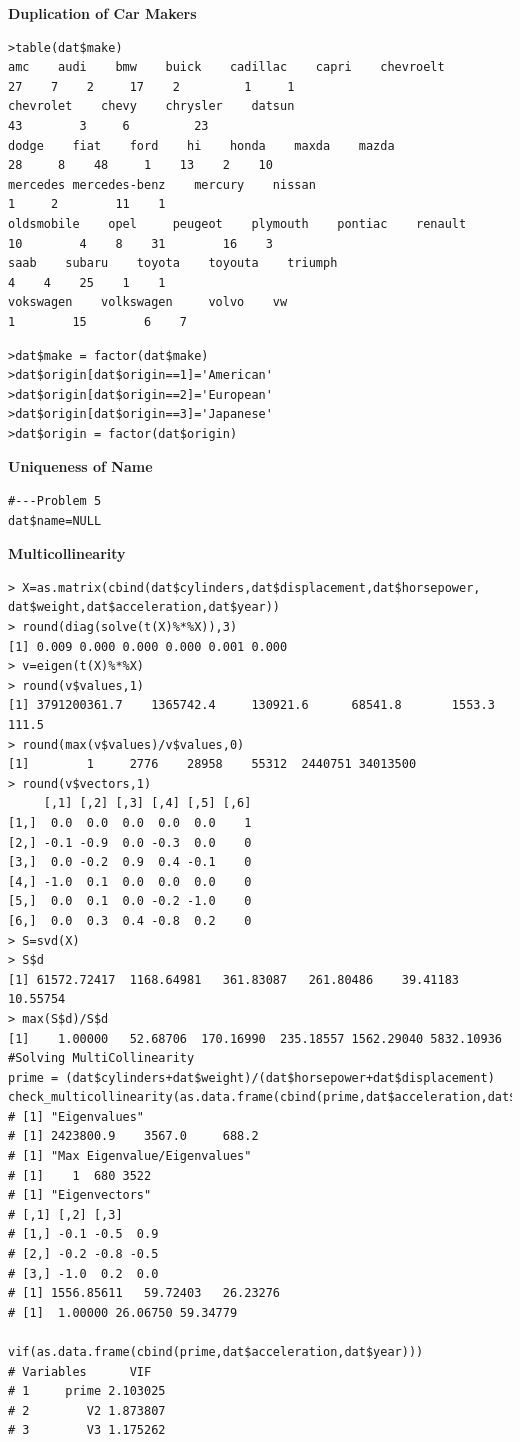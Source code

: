 \documentclass[11pt]{article} %
\begin{document}
\textbf{Duplication of Car Makers}
\begin{lstlisting}
>table(dat$make)
amc    audi    bmw    buick    cadillac    capri    chevroelt
27    7    2     17    2         1     1 
chevrolet    chevy    chrysler    datsun 
43        3     6         23 
dodge    fiat    ford    hi    honda    maxda    mazda
28     8    48     1    13    2    10    
mercedes mercedes-benz    mercury    nissan 
1     2        11    1 
oldsmobile    opel     peugeot    plymouth    pontiac    renault
10        4    8    31        16    3
saab    subaru    toyota    toyouta    triumph
4    4    25    1    1 
vokswagen    volkswagen     volvo    vw 
1        15        6    7 
\end{lstlisting}
\begin{lstlisting}
>dat$make = factor(dat$make)
>dat$origin[dat$origin==1]='American'
>dat$origin[dat$origin==2]='European'
>dat$origin[dat$origin==3]='Japanese'
>dat$origin = factor(dat$origin)
\end{lstlisting}
\textbf{Uniqueness of Name}
\begin{lstlisting}
#---Problem 5
dat$name=NULL
\end{lstlisting}
\textbf{Multicollinearity}
\begin{lstlisting}
> X=as.matrix(cbind(dat$cylinders,dat$displacement,dat$horsepower,
dat$weight,dat$acceleration,dat$year))
> round(diag(solve(t(X)%*%X)),3) 
[1] 0.009 0.000 0.000 0.000 0.001 0.000
> v=eigen(t(X)%*%X)
> round(v$values,1)
[1] 3791200361.7    1365742.4     130921.6      68541.8       1553.3        111.5
> round(max(v$values)/v$values,0)
[1]        1     2776    28958    55312  2440751 34013500
> round(v$vectors,1)
     [,1] [,2] [,3] [,4] [,5] [,6]
[1,]  0.0  0.0  0.0  0.0  0.0    1
[2,] -0.1 -0.9  0.0 -0.3  0.0    0
[3,]  0.0 -0.2  0.9  0.4 -0.1    0
[4,] -1.0  0.1  0.0  0.0  0.0    0
[5,]  0.0  0.1  0.0 -0.2 -1.0    0
[6,]  0.0  0.3  0.4 -0.8  0.2    0
> S=svd(X)
> S$d
[1] 61572.72417  1168.64981   361.83087   261.80486    39.41183    10.55754
> max(S$d)/S$d
[1]    1.00000   52.68706  170.16990  235.18557 1562.29040 5832.10936
#Solving MultiCollinearity
prime = (dat$cylinders+dat$weight)/(dat$horsepower+dat$displacement)
check_multicollinearity(as.data.frame(cbind(prime,dat$acceleration,dat$year)))
# [1] "Eigenvalues"
# [1] 2423800.9    3567.0     688.2
# [1] "Max Eigenvalue/Eigenvalues"
# [1]    1  680 3522
# [1] "Eigenvectors"
# [,1] [,2] [,3]
# [1,] -0.1 -0.5  0.9
# [2,] -0.2 -0.8 -0.5
# [3,] -1.0  0.2  0.0
# [1] 1556.85611   59.72403   26.23276
# [1]  1.00000 26.06750 59.34779

vif(as.data.frame(cbind(prime,dat$acceleration,dat$year)))
# Variables      VIF
# 1     prime 2.103025
# 2        V2 1.873807
# 3        V3 1.175262
\end{lstlisting}
\end{document}
